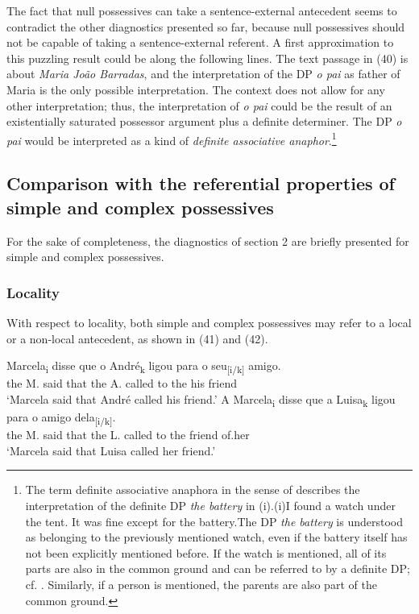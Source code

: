 \documentclass[output=paper]{langsci/langscibook}
\begin{document}
The fact that null possessives can take a sentence-external antecedent seems to contradict the other diagnostics presented so far, because null possessives should not be capable of taking a sentence-external referent. A first approximation to this puzzling result could be along the following lines. The text passage in (40) is about \textit{Maria João Barradas}, and the interpretation of the DP \textit{o pai} as father of Maria is the only possible interpretation. The context does not allow for any other interpretation; thus, the interpretation of \textit{o pai} could be the result of an existentially saturated possessor argument plus a definite determiner. The DP \textit{o pai} would be interpreted as a kind of \textit{definite associative anaphor}.\footnote{The term definite associative anaphora in the sense of \citet{Hawkins1978} describes the interpretation of the definite DP \textit{the battery} in (i).(i)I found a watch under the tent. It was fine except for the battery.The DP \textit{the battery} is understood as belonging to the previously mentioned watch, even if the battery itself has not been explicitly mentioned before. If the watch is mentioned, all of its parts are also in the common ground and can be referred to by a definite DP; cf. \citet{Heim1991}. Similarly, if a person is mentioned, the parents are also part of the common ground.}\textsuperscript{} 

\subsection{Comparison with the referential properties of simple and complex possessives}%

For the sake of completeness, the diagnostics of section 2 are briefly presented for simple and complex possessives.

\subsubsection{Locality}%

With respect to locality, both simple and complex possessives may refer to a local or a non-local antecedent, as shown in (41) and (42).

\ea%
    \label{ex:wein:41}
    \ea
    \gll Marcela\textsubscript{i} disse que o André\textsubscript{k} ligou para o seu\textsubscript{[i/k]} amigo.\\
         the M. said that the A. called to the his friend\\
    \glt ‘Marcela said that André called his friend.’
    \ex  
    \gll A Marcela\textsubscript{i} disse que a Luisa\textsubscript{k} ligou para o amigo dela\textsubscript{[i/k]}.\\
         the M. said that the L. called to the friend of.her\\
    \glt ‘Marcela said that Luisa called her friend.’
    \z
\z
\end{document}
